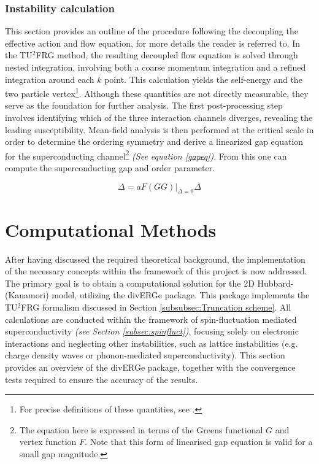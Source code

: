 \documentclass[12pt]{article}
\begin{document}
\medskip





\subsubsection{Instability calculation}

This section provides an outline of the procedure following the decoupling the effective action and flow equation, for more details the reader is referred to\cite{profe2023functional}. 
In the TU$^2$FRG method, the resulting decoupled flow equation is solved through nested integration, involving both a coarse momentum integration and a
refined integration around each $k$ point.  This calculation yields the self-energy and the two particle vertex\footnote{For precise definitions of these quantities, see \cite{metzner2012functional}.}.
Although these quantities are not directly measurable, they serve as the foundation for further analysis. The first post-processing step involves
identifying which of the three interaction channels diverges, revealing the leading susceptibility. Mean-field analysis\cite{reiss2007renormalized} is then performed at the critical scale in order to determine the ordering symmetry 
and derive a linearized gap equation for the superconducting channel\footnote{The equation here is expressed in terms of the Greens functional $G$ and vertex function $F$. Note that this form of linearised gap equation is valid for a small gap magnitude. }
\textit{(See equation \ref{gapeq})}\cite{profe2023functional}. From this one can compute 
the superconducting gap and order parameter.

\begin{equation}\label{gapeq}
    \Delta = aF(GG)|_{\Delta = 0}\Delta
\end{equation}



\section{Computational Methods}

After having discussed the required theoretical background, the implementation of the necessary concepts within the framework of
this project is now addressed. The primary goal is to obtain a computational solution 
for the 2D Hubbard-(Kanamori) model, utilizing the divERGe package. This package implements the TU$^2$FRG
formalism discussed in Section \ref{subsubsec:Truncation scheme}.
All calculations are conducted within the framework of spin-fluctuation mediated 
superconductivity \textit{(see Section \ref{subsec:spinfluct})}, focusing solely on  
electronic interactions and neglecting other instabilities, such as lattice 
instabilities (e.g. charge density waves or phonon-mediated superconductivity). 
This section provides an overview of the divERGe package, together with the convergence
tests required to ensure the accuracy of the results. 
\end{document}

